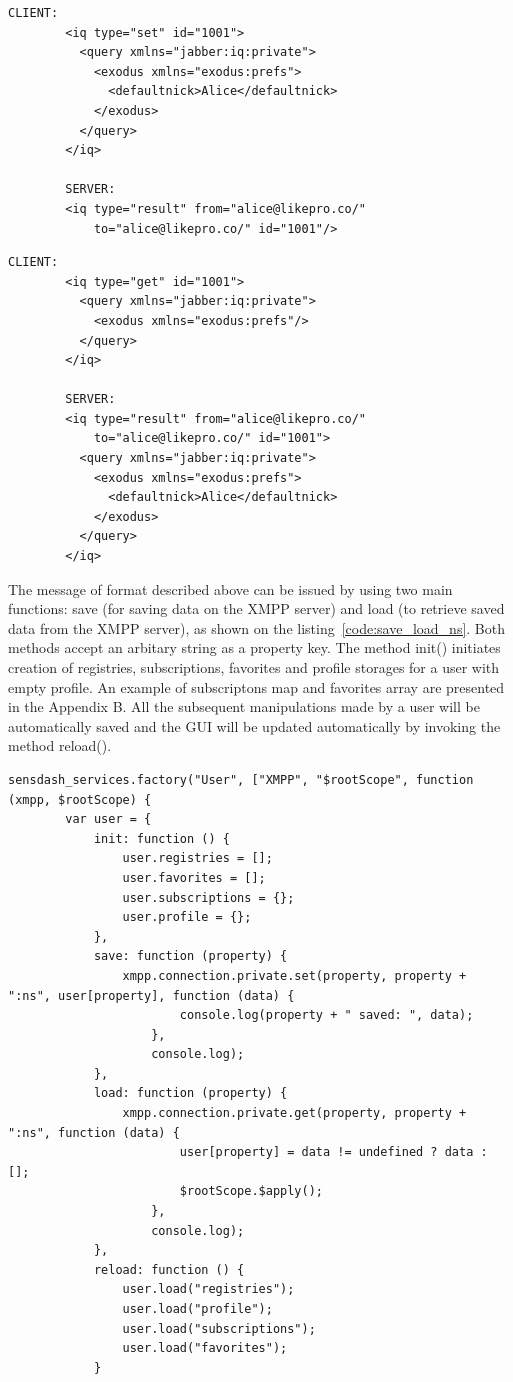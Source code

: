     \begin{lstlisting}[label=code:client_save,caption=Client Stores Private Data]
		CLIENT:
		<iq type="set" id="1001">
		  <query xmlns="jabber:iq:private">
		    <exodus xmlns="exodus:prefs">
		      <defaultnick>Alice</defaultnick>
		    </exodus>
		  </query>
		</iq>

		SERVER:
		<iq type="result" from="alice@likepro.co/"
		    to="alice@likepro.co/" id="1001"/>
    \end{lstlisting}

     \begin{lstlisting}[label=code:client_load,caption=Client Retrieves Private Data]
		CLIENT:
		<iq type="get" id="1001">
		  <query xmlns="jabber:iq:private">
		    <exodus xmlns="exodus:prefs"/>
		  </query>
		</iq>

		SERVER:
		<iq type="result" from="alice@likepro.co/"
		    to="alice@likepro.co/" id="1001">
		  <query xmlns="jabber:iq:private">
		    <exodus xmlns="exodus:prefs">
		      <defaultnick>Alice</defaultnick>
		    </exodus>
		  </query>
		</iq>
    \end{lstlisting}

    The message of format described above can be issued by using two main functions: save (for saving data on the XMPP server) and load (to retrieve saved data from the XMPP server), as shown on the listing~\ref{code:save_load_ns}. Both methods accept an arbitary string as a property key. The method init() initiates creation of registries, subscriptions, favorites and profile storages for a user with empty profile. An example of subscriptons map and favorites array are presented in the Appendix B. All the subsequent manipulations made by a user will be automatically saved and the GUI will be updated automatically by invoking the method reload().
	\begin{lstlisting}[label=code:save_load_ns,caption=Snippet of Save/Load preferences to a private namespace]
	    sensdash_services.factory("User", ["XMPP", "$rootScope", function (xmpp, $rootScope) {
        var user = {
            init: function () {
                user.registries = [];
                user.favorites = [];
                user.subscriptions = {};
                user.profile = {};
            },
            save: function (property) {
                xmpp.connection.private.set(property, property + ":ns", user[property], function (data) {
                        console.log(property + " saved: ", data);
                    },
                    console.log);
            },
            load: function (property) {
                xmpp.connection.private.get(property, property + ":ns", function (data) {
                        user[property] = data != undefined ? data : [];
                        $rootScope.$apply();
                    },
                    console.log);
            },
            reload: function () {
                user.load("registries");
                user.load("profile");
                user.load("subscriptions");
                user.load("favorites");
            }
	\end{lstlisting}

